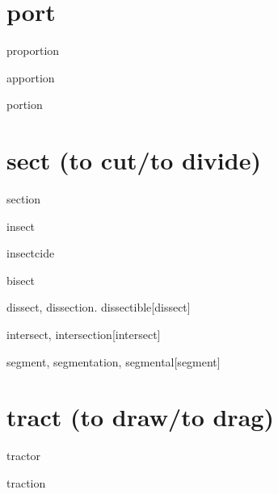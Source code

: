 \section{port}

\begin{wordRef}{proportion}
\end{wordRef}

\begin{wordRef}{apportion}
\end{wordRef}

\begin{wordRef}{portion}
\end{wordRef}

\section{sect (to cut/to divide)}

\begin{wordRef}{section}
\end{wordRef}

\begin{wordRef}{insect}
\end{wordRef}

\begin{wordRef}{insectcide}
\end{wordRef}

\begin{wordRef}{bisect}
\end{wordRef}

\begin{wordRef}{dissect, dissection. dissectible}[dissect]
\end{wordRef}

\begin{wordRef}{intersect, intersection}[intersect]
\end{wordRef}

\begin{wordRef}{segment, segmentation, segmental}[segment]
\end{wordRef}

\section{tract (to draw/to drag)}

\begin{wordRef}{tractor}
\end{wordRef}

\begin{wordRef}{traction}
\end{wordRef}

